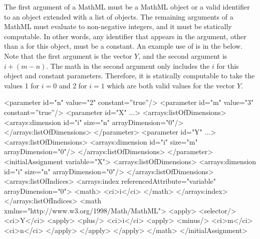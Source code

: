 The first argument of a MathML  must be a MathML  object or a valid identifier to an \SBase object extended with a list of \Dimension objects. The remaining arguments of a MathML  must evaluate to non-negative integers, and it must be statically computable.  In other words, any identifier that appears in the argument, other than a \Dimension {} for this object, must be a constant.  An example use of  is in the \InitialAssignment below.  Note that the first argument is the vector $Y$, and the second argument is $i + (m-n)$.  The math in the second argument only includes the \Dimension {} $i$ for this object and constant parameters.  Therefore, it is statically computable to take the values 1 for $i=0$ and 2 for $i=1$ which are both valid values for the vector $Y$.
\begin{example}
<parameter id="n" value="2" constant=''true''/>
<parameter id="m" value="3" constant=''true''/>
<parameter id="X" ...>
  <arrays:listOfDimensions>
    <arrays:dimension id="i" size="n" arrayDimension="0"/>
  </arrays:listOfDimensions>
</parameter>
<parameter id="Y" ...>
  <arrays:listOfDimensions>
    <arrays:dimension id="i" size="m" arrayDimension="0"/>
  </arrays:listOfDimensions>
</parameter>
<initialAssignment variable="X"> 
  <arrays:listOfDimensions>
    <arrays:dimension id="i" size="n" arrayDimension="0"/>
  </arrays:listOfDimensions>
  <arrays:listOfIndices>
    <arrays:index referencedAttribute="variable" arrayDimension="0">
      <math>
        <ci>i</ci>
      </math>
    </arrays:index>
  </arrays:listOfIndices>
  <math xmlns="http://www.w3.org/1998/Math/MathML">
    <apply>
      <selector/> 
        <ci>Y</ci> 
        <apply>
          <plus/>
            <ci>i</ci>
            <apply>
              <minus/>
                <ci>m</ci>
                <ci>n</ci>
            </apply>
        </apply>
    </apply>
  </math>
</initialAssignment>
\end{example}
